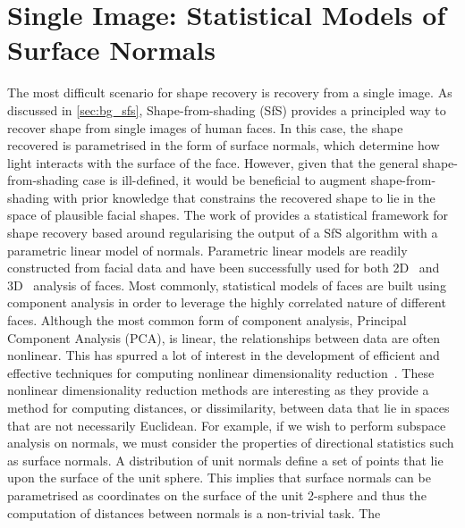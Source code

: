 \chapter{Single Image: Statistical Models of Surface Normals}\label{ch:singl_imag}
\minitoc{}
The most difficult scenario for shape recovery is recovery from a single
image. As discussed in \cref{sec:bg_sfs}, Shape-from-shading (SfS) provides a
principled way to recover shape from single images of human faces. In this case,
the shape recovered is parametrised in the form of surface normals, 
which determine how light interacts with the surface of the face. 
However, given that the general
shape-from-shading case is ill-defined, it would be beneficial to augment
shape-from-shading with prior knowledge that constrains the recovered shape to
lie in the space of plausible facial shapes. The work of
\citet{smith2006recovering,smith2008facial}
provides a statistical framework for shape recovery based around regularising
the output of a SfS algorithm with a parametric linear model of normals.
Parametric linear models are readily constructed from facial data and have
been successfully used for both 2D~\cite{cootes2001active,turk1991eigenfaces}
and 3D~\cite{enciso1999synthesis,atick1996statistical} analysis of faces.
Most commonly, statistical models of faces are built using component analysis
in order to leverage the highly correlated nature of different faces. Although
the most common form of component analysis, Principal Component Analysis (PCA),
is linear, the relationships between data are often nonlinear.
This has spurred a lot of interest in the development of
efficient and effective techniques for computing nonlinear dimensionality
reduction~\cite{yang2005kpca,goudelis2007class,scholkopf1998nonlinear}. These
nonlinear dimensionality reduction methods are interesting as they provide
a method for computing distances, or dissimilarity, between data that
lie in spaces that are not necessarily Euclidean. For example, if we wish to
perform subspace analysis on normals, we must consider the properties of
directional statistics such as surface normals.
A distribution of unit normals define a set of points that lie upon the
surface of the unit sphere. This implies that surface normals can be
parametrised as coordinates on the surface of the unit 2-sphere and thus
the computation of distances between normals is a non-trivial task. The
